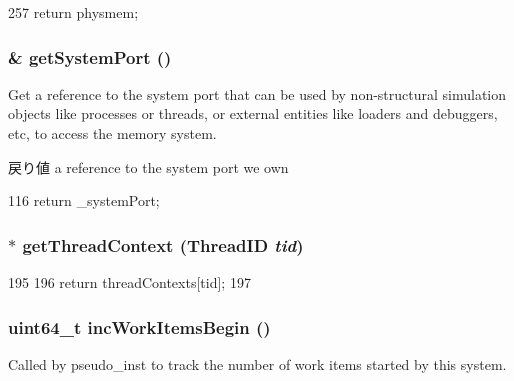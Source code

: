 \begin{DoxyCode}
257 { return physmem; }
\end{DoxyCode}
\hypertarget{classSystem_ac19ed7d066a1932ab5b2309af9af350c}{
\subsubsection[{getSystemPort}]{\& getSystemPort ()}}
\label{classSystem_ac19ed7d066a1932ab5b2309af9af350c}
Get a reference to the system port that can be used by non-\/structural simulation objects like processes or threads, or external entities like loaders and debuggers, etc, to access the memory system.

\begin{DoxyReturn}{戻り値}
a reference to the system port we own 
\end{DoxyReturn}



\begin{DoxyCode}
116 { return _systemPort; }
\end{DoxyCode}
\hypertarget{classSystem_af349994bde91bd82c98f31e10c495cd1}{
\subsubsection[{getThreadContext}]{$\ast$ getThreadContext ({\bf ThreadID} {\em tid})}}
\label{classSystem_af349994bde91bd82c98f31e10c495cd1}



\begin{DoxyCode}
195     {
196         return threadContexts[tid];
197     }
\end{DoxyCode}
\hypertarget{classSystem_a3820060901c04aa2e536f374113a1daf}{
\subsubsection[{incWorkItemsBegin}]{\setlength{\rightskip}{0pt plus 5cm}uint64\_\-t incWorkItemsBegin ()}}
\label{classSystem_a3820060901c04aa2e536f374113a1daf}
Called by pseudo\_\-inst to track the number of work items started by this system. 


